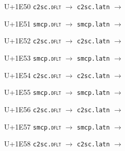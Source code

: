 \documentclass{article}
\begin{document}
\begin{substitutions}
\goodbreak

U+1E50  \linebreak
    \texttt{c2sc.\textsc{dflt}} $\to$  \linebreak
    \texttt{c2sc.latn} $\to$  

\goodbreak

U+1E51  \linebreak
    \texttt{smcp.\textsc{dflt}} $\to$  \linebreak
    \texttt{smcp.latn} $\to$  

\goodbreak

U+1E52  \linebreak
    \texttt{c2sc.\textsc{dflt}} $\to$  \linebreak
    \texttt{c2sc.latn} $\to$  

\goodbreak

U+1E53  \linebreak
    \texttt{smcp.\textsc{dflt}} $\to$  \linebreak
    \texttt{smcp.latn} $\to$  

\goodbreak

U+1E54  \linebreak
    \texttt{c2sc.\textsc{dflt}} $\to$  \linebreak
    \texttt{c2sc.latn} $\to$  

\goodbreak

U+1E55  \linebreak
    \texttt{smcp.\textsc{dflt}} $\to$  \linebreak
    \texttt{smcp.latn} $\to$  

\goodbreak

U+1E56  \linebreak
    \texttt{c2sc.\textsc{dflt}} $\to$  \linebreak
    \texttt{c2sc.latn} $\to$  

\goodbreak

U+1E57  \linebreak
    \texttt{smcp.\textsc{dflt}} $\to$  \linebreak
    \texttt{smcp.latn} $\to$  

\goodbreak

U+1E58  \linebreak
    \texttt{c2sc.\textsc{dflt}} $\to$  \linebreak
    \texttt{c2sc.latn} $\to$  


\end{substitutions}
\end{document}
